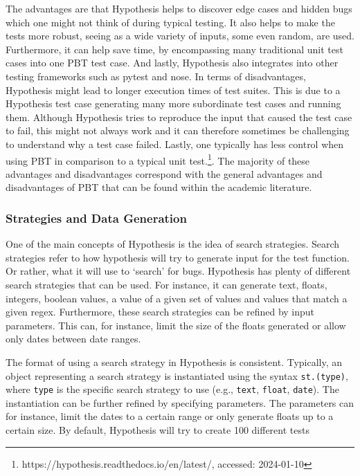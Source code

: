 \documentclass[runningheads]{llncs}
\begin{document}
The advantages are that Hypothesis helps to discover edge cases and hidden bugs which one might not think of during typical testing. It also helps to make the tests more robust, seeing as a wide variety of inputs, some even random, are used.
Furthermore, it can help save time, by encompassing many traditional unit test cases into one PBT test case. And lastly, Hypothesis also integrates into other testing frameworks such as pytest and nose. In terms of disadvantages, Hypothesis might lead to longer execution times of test suites. This is due to a Hypothesis test case generating many more subordinate test cases and running them. Although Hypothesis tries to reproduce the input that caused the test case to fail, this might not always work and it can therefore sometimes be challenging to understand why a test case failed.
Lastly, one typically has less control when using PBT in comparison to a typical unit test.\footnote{https://hypothesis.readthedocs.io/en/latest/, accessed: 2024-01-10}. The majority of these advantages and disadvantages correspond with the general advantages and disadvantages of PBT that can be found within the academic literature.

\subsubsection{Strategies and Data Generation}
One of the main concepts of Hypothesis is the idea of search strategies. Search strategies refer to how hypothesis will try to generate input for the test function. Or rather, what it will use to `search' for bugs. Hypothesis has plenty of different search strategies that can be used. For instance, it can generate text, floats, integers, boolean values, a value of a given set of values and values that match a given regex. Furthermore, these search strategies can be refined by input parameters. This can, for instance, limit the size of the floats generated or allow only dates between date ranges.

The format of using a search strategy in Hypothesis is consistent. Typically, an object representing a search strategy is instantiated using the syntax \texttt{st.(type)}, where \texttt{type} is the specific search strategy to use (e.g., \texttt{text}, \texttt{float}, \texttt{date}). The instantiation can be further refined by specifying parameters. The parameters can for instance, limit the dates to a certain range or only generate floats up to a certain size. By default, Hypothesis will try to create 100 different tests
\end{document}
